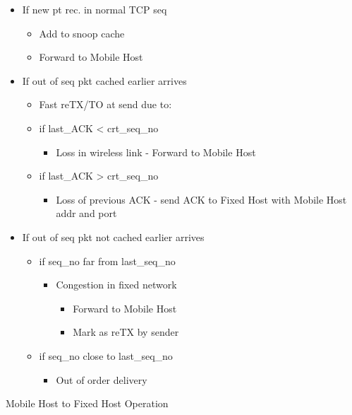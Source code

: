 \begin{itemize}
	\item If new pt rec. in normal TCP seq
	\begin{itemize}
		\item Add to snoop cache
		\item Forward to Mobile Host
	\end{itemize}
	\item If out of seq pkt cached earlier arrives
	\begin{itemize}
		\item Fast reTX/TO at send due to:
		\item if last\_ACK < crt\_seq\_no
		\begin{itemize}
			\item Loss in wireless link - Forward to Mobile Host
		\end{itemize}
		\item if last\_ACK > crt\_seq\_no
		\begin{itemize}
			\item Loss of previous ACK - send ACK to Fixed Host with
				Mobile Host addr and port
		\end{itemize}
	\end{itemize}
	\item If out of seq pkt not cached earlier arrives
	\begin{itemize}
		\item if seq\_no far from last\_seq\_no
		\begin{itemize}
			\item Congestion in fixed network
			\begin{itemize}
				\item Forward to Mobile Host
				\item Mark as reTX by sender
			\end{itemize}
		\end{itemize}
		\item if seq\_no close to last\_seq\_no
		\begin{itemize}
			\item Out of order delivery
		\end{itemize}
	\end{itemize}
\end{itemize}
Mobile Host to Fixed Host Operation
